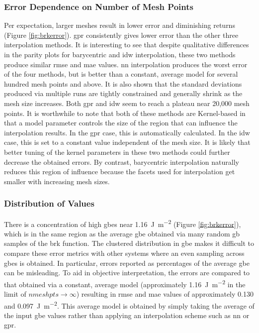 \documentclass[preprint,12pt]{elsarticle}
\begin{document}
\subsubsection{Error Dependence on Number of Mesh Points} \label{results:general:mesh size}
Per expectation, larger meshes result in lower error and diminishing returns (Figure \ref{fig:brkerror}). \Gls{gpr} consistently gives lower error than the other three interpolation methods. It is interesting to see that despite qualitative differences in the parity plots for barycentric and \gls{idw} interpolation, these two methods produce similar \gls{rmse} and \gls{mae} values. \Gls{nn} interpolation produces the worst error of the four methods, but is better than a constant, average model for several hundred mesh points and above. It is also shown that the standard deviations produced via multiple runs are tightly constrained and generally shrink as the mesh size increases. Both \gls{gpr} and \gls{idw} seem to reach a plateau near 20,000 mesh points. It is worthwhile to note that both of these methods are Kernel-based in that a model parameter controls the size of the region that can influence the interpolation results. In the \gls{gpr} case, this is automatically calculated. In the \gls{idw} case, this is set to a constant value independent of the mesh size. It is likely that better tuning of the kernel parameters in these two methods could further decrease the obtained errors. By contrast, barycentric interpolation naturally reduces this region of influence because the facets used for interpolation get smaller with increasing mesh sizes.

\subsubsection{Distribution of  Values} \label{results:general:distribution}
There is a concentration of high \glspl{gbe} near \SI{1.16}{\J\per\square\meter} (Figure \ref{fig:brkerror}), which is in the same region as the average \gls{gbe} obtained via many random \gls{gb} samples of the \gls{brk} function. The clustered distribution in \gls{gbe} makes it difficult to compare these error metrics with other systems where an even sampling across \glspl{gbe} is obtained. In particular, errors reported as percentages of the average \gls{gbe} can be misleading. To aid in objective interpretation, the errors are compared to that obtained via a constant, average model (approximately \SI{1.16}{\J\per\square\meter} in the limit of $nmeshpts \rightarrow \infty$) resulting in \gls{rmse} and \gls{mae} values of approximately \num{0.130} and \SI{0.097}{\J\per\square\meter}. This average model is obtained by simply taking the average of the input \gls{gbe} values rather than applying an interpolation scheme such as \gls{nn} or \gls{gpr}.
\end{document}
